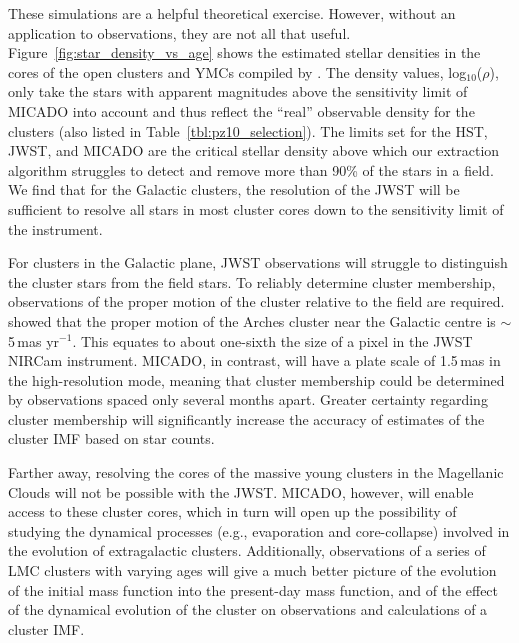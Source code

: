 \documentclass[referee]{aa}
\newcommand{\s}{$\sim$}
\newcommand{\h}[1]{$^{#1}$}
\begin{document}
These simulations are a helpful theoretical exercise.
However, without an application to observations, they are not all that useful.
Figure~\ref{fig:star_density_vs_age} shows the estimated stellar densities in the cores of the open clusters and YMCs compiled by \citet{portegies2010}.
The density values, log$_{10}$($\rho$), only take the stars with apparent magnitudes above the sensitivity limit of MICADO into account and thus reflect the ``real'' observable density for the clusters (also listed in Table~\ref{tbl:pz10_selection}).
The limits set for the HST, JWST, and MICADO are the critical stellar density above which our extraction algorithm struggles to detect and remove more than 90\% of the stars in a field.
We find that for the Galactic clusters, the resolution of the JWST will be sufficient to resolve all stars in most cluster cores down to the sensitivity limit of the instrument.

For clusters in the Galactic plane, JWST observations will struggle to distinguish the cluster stars from the field stars.
To reliably determine cluster membership, observations of the proper motion of the cluster relative to the field are required.
\citet{stolte2008} showed that the proper motion of the Arches cluster near the Galactic centre is \s5\,mas yr\h{-1}.
This equates to about one-sixth the size of a pixel in the JWST NIRCam instrument.
MICADO, in contrast, will have a plate scale of 1.5\,mas in the high-resolution mode, meaning that cluster membership could be determined by observations spaced only several months apart.
Greater certainty regarding cluster membership will significantly increase the accuracy of estimates of the cluster IMF based on star counts.

Farther away, resolving the cores of the massive young clusters in the Magellanic Clouds will not be possible with the JWST. MICADO, however, will enable access to these cluster cores, which in turn will open up the possibility of studying the dynamical processes (e.g., evaporation and core-collapse) involved in the evolution of extragalactic clusters.
Additionally, observations of a series of LMC clusters with varying ages will give a much better picture of the evolution of the initial mass function into the present-day mass function, and of the effect of the dynamical evolution of the cluster on observations and calculations of a cluster IMF\@.
\end{document}

